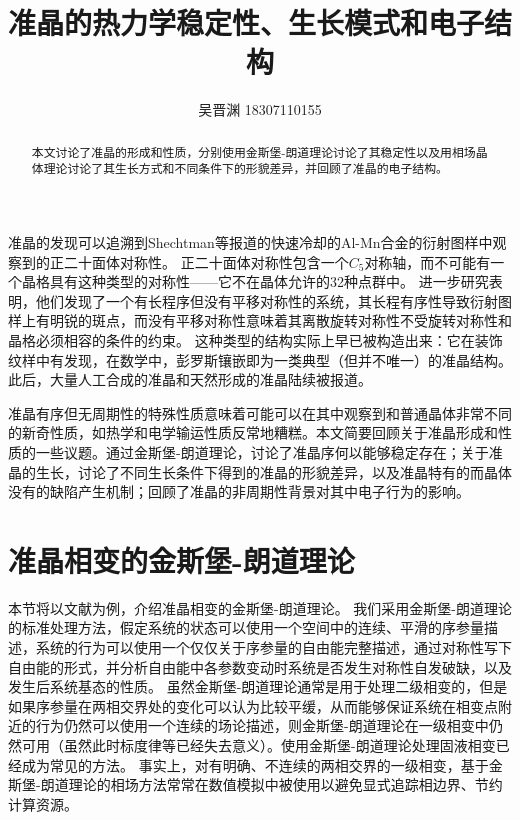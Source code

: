 \documentclass[hyperref, UTF8, a4paper]{ctexart}
\title{准晶的热力学稳定性、生长模式和电子结构}
\author{吴晋渊 18307110155}
\date{}
\begin{document}
\maketitle

\vspace{-3em}

\begin{abstract}
    本文讨论了准晶的形成和性质，分别使用金斯堡-朗道理论讨论了其稳定性以及用相场晶体理论讨论了其生长方式和不同条件下的形貌差异，并回顾了准晶的电子结构。
\end{abstract}

\vspace{3em}

准晶的发现可以追溯到Shechtman等报道的快速冷却的Al-Mn合金的衍射图样中观察到的正二十面体对称性\cite{PhysRevLett.53.1951}。
正二十面体对称性包含一个$C_5$对称轴，而不可能有一个晶格具有这种类型的对称性——它不在晶体允许的32种点群中\cite{Johnston_1960}。
进一步研究表明，他们发现了一个有长程序但没有平移对称性的系统，其长程有序性导致衍射图样上有明锐的斑点，而没有平移对称性意味着其离散旋转对称性不受旋转对称性和晶格必须相容的条件的约束。
这种类型的结构实际上早已被构造出来：它在装饰纹样中有发现\cite{science.1135491}，在数学中，彭罗斯镶嵌即为一类典型（但并不唯一）的准晶结构。
此后，大量人工合成的准晶\cite{PhysRevLett.55.511,PhysRevLett.59.1010}和天然形成的准晶陆续被报道\cite{science.1170827}。

准晶有序但无周期性的特殊性质意味着可能可以在其中观察到和普通晶体非常不同的新奇性质，如热学和电学输运性质反常地糟糕\cite{Dolin_ek_2012}。本文简要回顾关于准晶形成和性质的一些议题。通过金斯堡-朗道理论，讨论了准晶序何以能够稳定存在；关于准晶的生长，讨论了不同生长条件下得到的准晶的形貌差异，以及准晶特有的而晶体没有的缺陷产生机制；回顾了准晶的非周期性背景对其中电子行为的影响。

\section{准晶相变的金斯堡-朗道理论}\label{sec:gl}

本节将以文献\cite{PhysRevB.32.5764}为例，介绍准晶相变的金斯堡-朗道理论。
我们采用金斯堡-朗道理论的标准处理方法，假定系统的状态可以使用一个空间中的连续、平滑的序参量描述，系统的行为可以使用一个仅仅关于序参量的自由能完整描述，通过对称性写下自由能的形式，并分析自由能中各参数变动时系统是否发生对称性自发破缺，以及发生后系统基态的性质。
虽然金斯堡-朗道理论通常是用于处理二级相变的，但是如果序参量在两相交界处的变化可以认为比较平缓，从而能够保证系统在相变点附近的行为仍然可以使用一个连续的场论描述，则金斯堡-朗道理论在一级相变中仍然可用（虽然此时标度律等已经失去意义）。使用金斯堡-朗道理论处理固液相变已经成为常见的方法\cite{fabrizio2008,PhysRevB.90.104101}。
事实上，对有明确、不连续的两相交界的一级相变，基于金斯堡-朗道理论的相场方法常常在数值模拟中被使用以避免显式追踪相边界、节约计算资源\cite{provatas2011phase,boettinger2002phase}。
\end{document}
